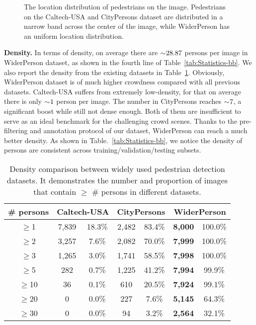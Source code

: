 \documentclass[journal]{IEEEtran}
\begin{document}
\begin{figure*}[t]
\centering
{}
\caption{The location distribution of pedestrians on the image. Pedestrians on the Caltech-USA and CityPersons dataset are distributed in a narrow band across the center of the image, while WiderPerson has an uniform location distribution.}
\label{fig:heatmap}
\end{figure*}


{\flushleft \textbf{Density. }}
In terms of density, on average there are $\sim\negmedspace 28.87$ persons per image in WiderPerson dataset, as shown in the fourth line of Table~\ref{tab:Statistics-bb}. We also report the density from the existing datasets in Table~\ref{tab:density}. Obviously, WiderPerson dataset is of much higher crowdness compared with all previous datasets. Caltech-USA suffers from extremely low-density, for that on average there is only $\sim\negmedspace1$ person per image. The number in CityPersons reaches $\sim\negmedspace7$, a significant boost while still not dense enough. Both of them are insufficient to serve as an ideal benchmark for the challenging crowd scenes. Thanks to the pre-filtering and annotation protocol of our dataset, WiderPerson can reach a much better density. As shown in Table.~\ref{tab:Statistics-bb}, we notice the density of persons are consistent across training/validation/testing subsets.

\begin{table}[t]
\caption{Density comparison between widely used pedestrian detection datasets. It demonstrates the number and proportion of images that contain $\ge$ \# persons in different datasets.}
\label{tab:density}
\setlength{\tabcolsep}{7pt}
\begin{center}
\begin{tabular}{c|cc|cc|cc}
\toprule[2pt]
{\# persons} & \multicolumn{2}{c|}{Caltech-USA} & \multicolumn{2}{c|}{CityPersons} & \multicolumn{2}{c}{WiderPerson} \\
\midrule
$\ge$1 & {7,839} & {18.3\%} & {2,482} & {83.4\%} & \textbf{8,000} & {100.0\%} \\
$\ge$2 & {3,257} & {7.6\%} & {2,082} & {70.0\%} & \textbf{7,999} & {100.0\%} \\
$\ge$3 & {1,265} & {3.0\%} & {1,741} & {58.5\%} & \textbf{7,998} & {100.0\%} \\
$\ge$5 & {282} & {0.7\%} & {1,225} & {41.2\%} & \textbf{7,994} & {99.9\%} \\
$\ge$10 & {36} & {0.1\%} & {610} & {20.5\%} & \textbf{7,924} & {99.1\%} \\
$\ge$20 & {0} & {0.0\%} & {227} & {7.6\%} & \textbf{5,145} & {64.3\%} \\
$\ge$30 & {0} & {0.0\%} & {94} & {3.2\%} & \textbf{2,564} & {32.1\%} \\
\bottomrule[2pt]
\end{tabular}
\end{center}
\end{table}
\end{document}
